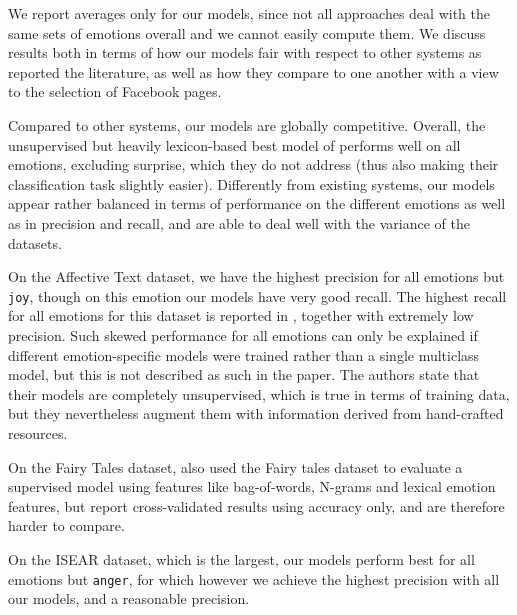 \documentclass[11pt]{article}
\begin{document}
\bigskip

\noindent 
We report averages only for our models, since not all approaches deal with the same sets of emotions overall and we cannot easily compute them. 
We discuss results both in terms of how our models fair with respect to other systems as reported the literature, as well as how they compare to one another with a view to the selection of Facebook pages.


Compared to other systems, our models are globally competitive. Overall, the unsupervised but heavily lexicon-based best model of \cite{kim2010evaluation} performs well on all emotions, excluding surprise, which they do not address (thus also making their classification task slightly easier). Differently from existing systems,  our models appear rather balanced in terms of performance on the different emotions as well as in precision and recall, and are able to deal well with the variance of the datasets. 

On the Affective Text dataset, we have the highest precision for all emotions but \texttt{joy}, though on this emotion our models have very good recall. The highest recall for all emotions for this dataset is reported in \cite{strapparava2008learning}, together with extremely low precision. Such skewed performance for all emotions can only be explained if different emotion-specific models were trained rather than a single multiclass model, but this is not described as such in the paper. The authors state that their models are completely unsupervised, which is true in terms of training data, but they nevertheless augment them with information derived from hand-crafted resources. 



On the Fairy Tales dataset, \cite{kim2010evaluation} 
 also used the Fairy tales dataset to evaluate a supervised model using features like bag-of-words, N-grams and lexical emotion features, but report cross-validated results using accuracy only, and are therefore harder to compare.

On the ISEAR dataset, which is the largest, our models perform best for all emotions but \texttt{anger}, for which however we achieve the highest precision with all our models, and a reasonable precision.
\end{document}
